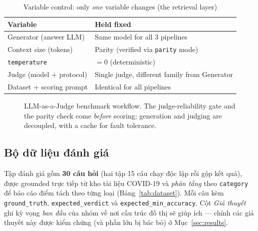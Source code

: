 \documentclass[conference]{IEEEtran}
\begin{document}
\begin{table}[!t]
\caption{Variable control: only \emph{one} variable changes (the retrieval layer)}
\label{tab:control}
\centering
\footnotesize
\begin{tabular}{@{}p{} p{}@{}}
\toprule
\textbf{Variable} & \textbf{Held fixed} \\
\midrule
Generator (answer LLM) & Same model for all 3 pipelines \\
Context size (tokens) & Parity (verified via \texttt{parity} mode) \\
\texttt{temperature} & $=0$ (deterministic) \\
Judge (model + protocol) & Single judge, different family from Generator \\
Dataset + scoring prompt & Identical for all pipelines \\
\bottomrule
\end{tabular}
\end{table}

\begin{figure}[!t]
\centering
{}
\caption{LLM-as-a-Judge benchmark workflow. The judge-reliability gate and the parity check come \emph{before} scoring; generation and judging are decoupled, with a cache for fault tolerance.}
\label{fig:bench}
\end{figure}

\subsection{Bộ dữ liệu đánh giá}
Tập đánh giá gồm \textbf{30 câu hỏi} (hai tập 15 câu chạy độc lập rồi gộp kết quả), được grounded trực tiếp từ kho tài liệu COVID-19 và \emph{phân tầng} theo \texttt{category} để báo cáo điểm tách theo từng loại (Bảng~\ref{tab:dataset}). Mỗi câu kèm \texttt{ground\_truth}, \texttt{expected\_verdict} và \texttt{expected\_min\_accuracy}. Cột \emph{Giả thuyết} ghi kỳ vọng \emph{ban đầu} của nhóm về nơi cấu trúc đồ thị sẽ giúp ích --- chính các giả thuyết này được kiểm chứng (và phần lớn bị bác bỏ) ở Mục~\ref{sec:results}.
\end{document}
